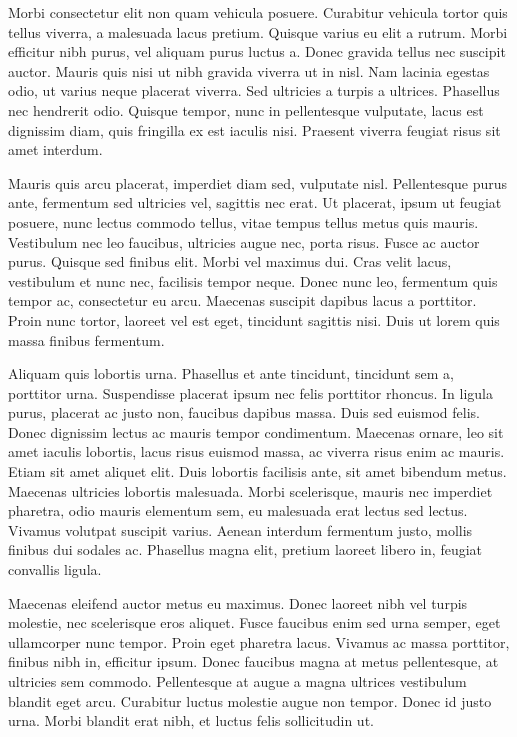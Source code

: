 Morbi consectetur elit non quam vehicula posuere. Curabitur vehicula tortor quis tellus viverra, a malesuada lacus pretium. Quisque varius eu elit a rutrum. Morbi efficitur nibh purus, vel aliquam purus luctus a. Donec gravida tellus nec suscipit auctor. Mauris quis nisi ut nibh gravida viverra ut in nisl. Nam lacinia egestas odio, ut varius neque placerat viverra. Sed ultricies a turpis a ultrices. Phasellus nec hendrerit odio. Quisque tempor, nunc in pellentesque vulputate, lacus est dignissim diam, quis fringilla ex est iaculis nisi. Praesent viverra feugiat risus sit amet interdum.

Mauris quis arcu placerat, imperdiet diam sed, vulputate nisl. Pellentesque purus ante, fermentum sed ultricies vel, sagittis nec erat. Ut placerat, ipsum ut feugiat posuere, nunc lectus commodo tellus, vitae tempus tellus metus quis mauris. Vestibulum nec leo faucibus, ultricies augue nec, porta risus. Fusce ac auctor purus. Quisque sed finibus elit. Morbi vel maximus dui. Cras velit lacus, vestibulum et nunc nec, facilisis tempor neque. Donec nunc leo, fermentum quis tempor ac, consectetur eu arcu. Maecenas suscipit dapibus lacus a porttitor. Proin nunc tortor, laoreet vel est eget, tincidunt sagittis nisi. Duis ut lorem quis massa finibus fermentum.

Aliquam quis lobortis urna. Phasellus et ante tincidunt, tincidunt sem a, porttitor urna. Suspendisse placerat ipsum nec felis porttitor rhoncus. In ligula purus, placerat ac justo non, faucibus dapibus massa. Duis sed euismod felis. Donec dignissim lectus ac mauris tempor condimentum. Maecenas ornare, leo sit amet iaculis lobortis, lacus risus euismod massa, ac viverra risus enim ac mauris. Etiam sit amet aliquet elit. Duis lobortis facilisis ante, sit amet bibendum metus. Maecenas ultricies lobortis malesuada. Morbi scelerisque, mauris nec imperdiet pharetra, odio mauris elementum sem, eu malesuada erat lectus sed lectus. Vivamus volutpat suscipit varius. Aenean interdum fermentum justo, mollis finibus dui sodales ac. Phasellus magna elit, pretium laoreet libero in, feugiat convallis ligula.

Maecenas eleifend auctor metus eu maximus. Donec laoreet nibh vel turpis molestie, nec scelerisque eros aliquet. Fusce faucibus enim sed urna semper, eget ullamcorper nunc tempor. Proin eget pharetra lacus. Vivamus ac massa porttitor, finibus nibh in, efficitur ipsum. Donec faucibus magna at metus pellentesque, at ultricies sem commodo. Pellentesque at augue a magna ultrices vestibulum blandit eget arcu. Curabitur luctus molestie augue non tempor. Donec id justo urna. Morbi blandit erat nibh, et luctus felis sollicitudin ut.

